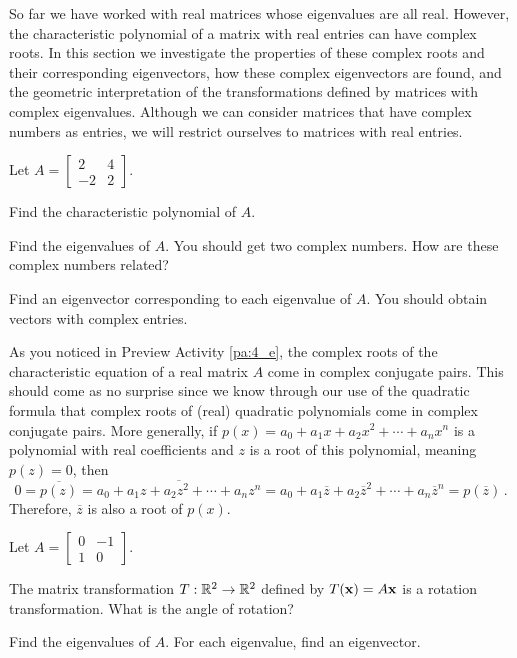 
So far we have worked with real matrices whose eigenvalues are all real. However, the characteristic polynomial of a matrix with real entries can have complex roots. In this section we investigate the properties of these complex roots and their corresponding eigenvectors, how these complex eigenvectors are found, and the geometric interpretation of the transformations defined by matrices with complex eigenvalues. Although we can consider matrices that have complex numbers as entries, we will restrict ourselves to matrices with real entries. 

\begin{pa} \label{pa:4_e} Let $A = \left[ \begin{array}{rc} 2&4 \\ -2&2 \end{array} \right]$.
	\be
	\item Find the characteristic polynomial of $A$.

	\item Find the eigenvalues of $A$. You should get two complex numbers. How are these complex numbers related?

	\item Find an eigenvector corresponding to each eigenvalue of $A$. You should obtain vectors with complex entries.

	\ee
\end{pa}


As you noticed in Preview Activity \ref{pa:4_e}, the complex roots of the characteristic equation of a real matrix $A$ come in complex conjugate pairs. This should come as no surprise since we know through our use of the quadratic formula that complex roots of (real) quadratic polynomials come in complex conjugate pairs. More generally, if $p(x)=a_0+a_1x+a_2x^2 + \cdots + a_nx^n$ is a polynomial with real coefficients and $z$ is a root of this polynomial, meaning $p(z)=0$, then 
\[ 0=\overline{p(z)} = \overline{a_0+a_1z+a_2z^2 + \cdots + a_nz^n} = a_0 + a_1 \overline{z} + a_2 \overline{z}^2 + \cdots + a_n \overline{z}^n = p(\overline{z})\, .\]
Therefore, $\overline{z}$ is also a root of $p(x)$.

\begin{activity} \label{act:4e_1} Let $A=\left[ \begin{array}{cr} 0&-1 \\ 1&0 \end{array} \right]$. 

	\ba
	\item The matrix transformation $T:\mathbb{R}^2 \to \mathbb{R}^2$ defined by $T(\mathbf{x})=A\mathbf{x}$ is a rotation transformation. What is the angle of rotation?
	
	
	
	\item Find the eigenvalues of $A$. For each eigenvalue, find an eigenvector.

	
		
	\ea
\end{activity}



